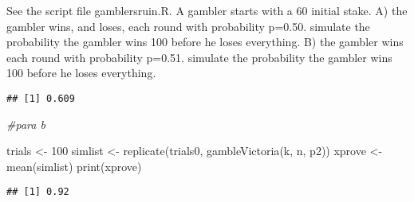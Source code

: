 \documentclass[
]{article}
\newenvironment{Shaded}{\begin{snugshade}}{\end{snugshade}}
\newcommand{\CommentTok}[1]{\textcolor[rgb]{0.56,0.35,0.01}{\textit{#1}}}
\newcommand{\DecValTok}[1]{\textcolor[rgb]{0.00,0.00,0.81}{#1}}
\newcommand{\FloatTok}[1]{\textcolor[rgb]{0.00,0.00,0.81}{#1}}
\newcommand{\FunctionTok}[1]{\textcolor[rgb]{0.00,0.00,0.00}{#1}}
\newcommand{\NormalTok}[1]{#1}
\newcommand{\OtherTok}[1]{\textcolor[rgb]{0.56,0.35,0.01}{#1}}
\newcommand{\SpecialCharTok}[1]{\textcolor[rgb]{0.00,0.00,0.00}{#1}}
\begin{document}
See the script file gamblersruin.R. A gambler starts with a 60 initial
stake. A) the gambler wins, and loses, each round with probability
p=0.50. simulate the probability the gambler wins 100 before he loses
everything. B) the gambler wins each round with probability p=0.51.
simulate the probability the gambler wins 100 before he loses
everything.

\begin{Shaded}
\end{Shaded}

\begin{verbatim}
## [1] 0.609
\end{verbatim}

\begin{Shaded}
\begin{Highlighting}[]
\CommentTok{\#para b}

\NormalTok{trials }\OtherTok{\textless{}{-}} \DecValTok{100}
\NormalTok{simlist }\OtherTok{\textless{}{-}} \FunctionTok{replicate}\NormalTok{(trials0, }\FunctionTok{gambleVictoria}\NormalTok{(k, n, p2))}
\NormalTok{xprove }\OtherTok{\textless{}{-}} \FunctionTok{mean}\NormalTok{(simlist) }
\FunctionTok{print}\NormalTok{(xprove)}
\end{Highlighting}
\end{Shaded}

\begin{verbatim}
## [1] 0.92
\end{verbatim}
\end{document}
